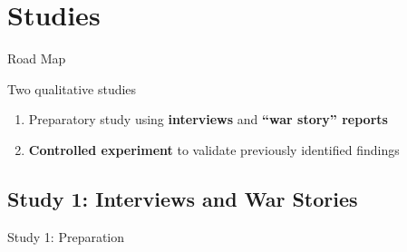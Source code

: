 \documentclass[aspectratio=169]{beamer}
\begin{document}
\section{Studies}

\begin{frame}[fragile]{Road Map}
    \begin{vfilleditems}
        \item Two qualitative studies
        \begin{enumerate}
            \vfill\item Preparatory study using \textbf{interviews} and \textbf{``war story'' reports}
            \vfill\item \textbf{Controlled experiment} to validate previously identified findings
        \end{enumerate}
    \end{vfilleditems}
\end{frame}


\subsection{Study 1: Interviews and War Stories}

\begin{frame}{Study 1: Preparation}
  \centering
  \vfill
  {\fontsize{30}{40}\selectfont\color{white}{Interviews\\and War Stories}}
  \vfill
\end{frame}
\end{document}
